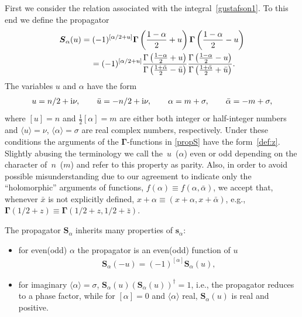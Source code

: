 \documentclass[pdftex]{sigma}
\numberwithin{equation}{section}
\begin{document}
First we consider the relation associated with the integral~\eqref{gustafson1}. To this end we define the propagator
\begin{gather}
\boldsymbol S_\alpha(u) = (-1)^{[\alpha/2+u]}\boldsymbol\Gamma\left(\frac{1-\alpha}2 + u\right)
\boldsymbol\Gamma\left(\frac{1-\alpha}2 - u\right)\nonumber\\
\hphantom{\boldsymbol S_\alpha(u)}{}
=(-1)^{[\alpha/2+u]}\frac{\Gamma\left(\frac{1-\alpha}2 + u\right)}{\Gamma\left(\frac{1+ \bar \alpha}2 - \bar u\right)}
\frac{\Gamma\left(\frac{1-\alpha}2 - u\right)}
{\Gamma\left(\frac{1+\bar \alpha}2 + \bar u\right)}.\label{propS}
\end{gather}
The variables $u$ and $\alpha$ have the form
\begin{gather*}
u=n/2+{\rm i}\nu, \qquad \bar u=-n/2+{\rm i}\nu,\qquad \alpha=m +\sigma,\qquad \bar \alpha=-m+ \sigma ,
\end{gather*}
where $[u]= n$ and $\frac{1}{2}[\alpha]= m$ are either both integer or half-integer numbers and $\langle u \rangle =\nu$, $\langle \alpha \rangle = \sigma$ are real complex numbers, respectively. Under these conditions the arguments of the $\boldsymbol \Gamma$-functions in \eqref{propS} have the form~\eqref{def:z}. Slightly abusing the terminology we call the~$u$~($\alpha$) even or odd depending on the character of~$n$~($m$) and refer to this property as parity. Also, in order to avoid possible misunderstanding due to our agreement to indicate only the ``holomorphic'' arguments of functions, $f(\alpha)\equiv f(\alpha,\bar\alpha)$, we accept that, whenever $\bar x$ is not explicitly defined, $x+\alpha \equiv (x+\alpha,x+\bar\alpha)$, e.g., $\boldsymbol \Gamma(1/2+z)\equiv \boldsymbol\Gamma(1/2+z,1/2+\bar z)$.

The propagator $\boldsymbol S_\alpha$ inherits many properties of $\boldsymbol s_\alpha$:
\begin{itemize}\itemsep=0pt
\item for even(odd) $\alpha$ the propagator is an even(odd) function of $u$
\begin{gather*}
\boldsymbol S_\alpha(-u)=(-1)^{[\alpha]}\boldsymbol S_\alpha(u),
\end{gather*}
\item for imaginary $\langle \alpha \rangle = \sigma$, $\boldsymbol S_\alpha(u)(\boldsymbol S_\alpha(u))^\dagger=1$, i.e., the propagator reduces to a phase factor, while for $[\alpha]=0$ and $\langle \alpha \rangle$ real, $\boldsymbol S_\alpha(u)$ is real and positive.
\end{itemize}
\end{document}
